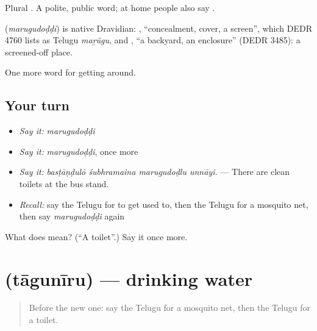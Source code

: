 Plural . A polite, public word; at home people also say .

\begin{cousinweb}
\textbf{} (\emph{marugudoḍḍi}) is native Dravidian: , \textquotedblleft{}concealment, cover, a screen\textquotedblright{}, which DEDR 4760 lists as Telugu \emph{maṟũgu}, and , \textquotedblleft{}a backyard, an enclosure\textquotedblright{} (DEDR 3485): a screened-off place.
\end{cousinweb}

\begin{grammarlens}[title={What you've built}]
One more word for getting around.
\end{grammarlens}

\subsection*{Your turn}
\begin{itemize}
\raggedright
  \item \emph{Say it:} \emph{marugudoḍḍi}
  \item \emph{Say it:} \emph{marugudoḍḍi}, once more
  \item \emph{Say it:} \emph{basṭāṇḍulō śubhramaina marugudoḍlu unnāyi.} — There are clean toilets at the bus stand.
  \item \emph{Recall:} say the Telugu for to get used to, then the Telugu for a mosquito net, then say \emph{marugudoḍḍi} again
\end{itemize}

\begin{tcolorbox}[breakable,colback=teal!4,colframe=teal!35!black,title={Before you move on}]
What does  mean? (\textquotedblleft{}A toilet\textquotedblright{}.) Say it once more.
\end{tcolorbox}
\section[\texorpdfstring{\te{తాగునీరు} (tāgunīru)}{తాగునీరు (tāgunīru)}]{ (tāgunīru) — drinking water}

\label{lesson:TE-C458-taguniru}



\begin{quote}
Before the new one: say the Telugu for a mosquito net, then the Telugu for a toilet.
\end{quote}

